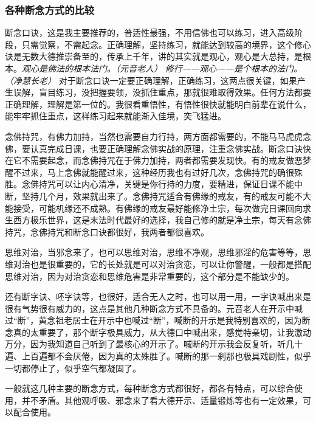 \subsubsection{各种断念方式的比较}

断念口诀，这是我主要推荐的，普适性最强，不用信佛也可以练习，进入高级阶段，只需觉察，不需起念。正确理解，坚持练习，就能达到较高的境界，这个修心诀是无数大德推崇备至的，传承上千年，讲的其实就是观心，观心是大总持，是根本。\textit{观心是佛法的根本法门。（元音老人）} \textit{修行——观心——是个根本的法门。（净慧长老）} 对于断念口诀一定要正确理解，正确练习，这两点很关键，如果产生误解，盲目练习，没把握要领，没抓住重点，那就很难取得效果。任何方法都要正确理解，理解是第一位的。我很看重悟性，有悟性很快就能明白前辈在说什么，能牢牢抓住重点，这样练习起来就能渐入佳境，突飞猛进。

念佛持咒，有佛力加持，当然也需要自力行持，两方面都需要的，不能马马虎虎念佛，要认真完成日课，也要正确理解念佛实战的原理，注重念佛实战。断念口诀快在它不需要起念，而念佛持咒在于佛力加持，两者都需要发现快。有的戒友做恶梦醒不过来，马上念佛就能醒过来，这种经历我也有过好几次，念佛持咒的确很殊胜。念佛持咒可以让内心清净，关键是你行持的力度，要精进，保证日课不能中断，坚持几个月，效果就出来了。念佛持咒适合有佛缘的戒友，有的戒友可能不大能接受，可能机缘还不成熟。有佛缘的戒友最好能修净土宗，每次做完日课回向求生西方极乐世界，这是末法时代最好的选择，我自己修的就是净土宗，每天有念佛持咒，念佛持咒和断念口诀都很好，我两者都很喜欢。

思维对治，当邪念来了，也可以思维对治，思维不净观，思维邪淫的危害等等，思维对治也是很重要的，它的长处就是可以对治贪恋，可以让你警醒，一般都是搭配思维对治，因为对治贪恋和思维危害是非常重要的，这个部分是不能缺少的。

还有断字诀、呸字诀等，也很好，适合无人之时，也可以用一用，一字诀喊出来是很有气势很有威力的，这点是其他几种断念方式不具备的。元音老人在开示中喊过“断”，黄念祖老居士在开示中也喊过“断”，喊断的开示是我特别喜欢的，因为断念真的太重要了，那个断字极具威力，从大德口中喊出来，感觉特亲切，让我激动万分，因为我知道自己听到了最核心的开示了。喊断的开示我会反复听，听几十遍、上百遍都不会厌倦，因为真的太殊胜了。喊断的那一刹那也极具戏剧性，似乎一切都停止了，似乎空气都凝固了。

一般就这几种主要的断念方式，每种断念方式都很好，都各有特点，可以综合使用，并不矛盾。其他观呼吸、邪念来了看大德开示、适量锻炼等也有一定效果，可以配合使用。

